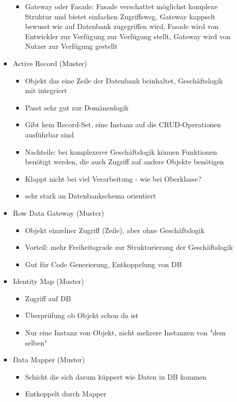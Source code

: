 \documentclass[paper=a4, fontsize=11pt]{scrartcl} %
\numberwithin{equation}{section} %
\numberwithin{figure}{section} %
\numberwithin{table}{section} %
\begin{document}
\begin{itemize}
\begin{itemize}
\begin{itemize}
\begin{itemize}
        \item Gateway oder Fasade: Fasade verschattet möglichst komplexe Struktur und bietet einfachen Zugriffsweg, Gateway kappselt bewusst wie auf Datenbank zugegriffen wird, Fasade wird von Entwickler zur Verfügung zur Verfügung stellt, Gateway wird von Nutzer zur Verfügung gestellt
      \end{itemize}
      \item Active Record (Muster)
      \begin{itemize}
        \item Objekt das eine Zeile der Datenbank beinhaltet, Geschäftslogik mit integriert
        \item Passt sehr gut zur Domänenlogik
        \item Gibt kein Record-Set, eine Instanz auf die CRUD-Operationen ausführbar sind
        \item Nachteile: bei komplexerer Geschäftslogik können Funktionen benötigt werden, die auch Zugriff auf andere Objekte benötigen
        \item Klappt nicht bei viel Verarbeitung - wie bei Oberklasse?
        \item sehr stark an Datenbankschema orientiert
      \end{itemize}
      \item Row Data Gateway (Muster)
      \begin{itemize}
        \item Objekt einzelner Zugriff (Zeile), aber ohne Geschäftslogik
        \item Vorteil: mehr Freiheitsgrade zur Strukturierung der Geschäftslogik
        \item Gut für Code Generierung, Entkoppelung von DB
      \end{itemize}
      \item Identity Map (Muster)
      \begin{itemize}
        \item Zugriff auf DB
        \item Überprüfung ob Objekt schon da ist
        \item Nur eine Instanz von Objekt, nicht mehrere Instanzen von "dem selben"
      \end{itemize}
      \item Data Mapper (Muster)
      \begin{itemize}
        \item Schicht die sich darum küppert wie Daten in DB kommen
        \item Entkoppelt durch Mapper

\end{itemize}
\end{itemize}
\end{itemize}
\end{itemize}
\end{document}
